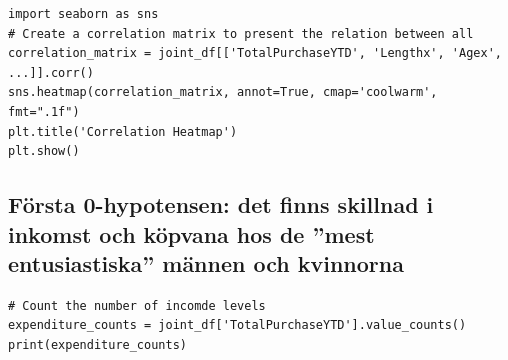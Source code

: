 \documentclass[]{article}
\begin{document}
\begin{lstlisting}
import seaborn as sns
# Create a correlation matrix to present the relation between all 
correlation_matrix = joint_df[['TotalPurchaseYTD', 'Lengthx', 'Agex', ...]].corr()
sns.heatmap(correlation_matrix, annot=True, cmap='coolwarm', fmt=".1f")
plt.title('Correlation Heatmap')
plt.show()
\end{lstlisting}


\subsection{Första 0-hypotensen: det finns skillnad i inkomst och köpvana hos de ''mest entusiastiska'' männen och kvinnorna}

\begin{lstlisting}
# Count the number of incomde levels
expenditure_counts = joint_df['TotalPurchaseYTD'].value_counts()
print(expenditure_counts)
\end{lstlisting}
\end{document}
